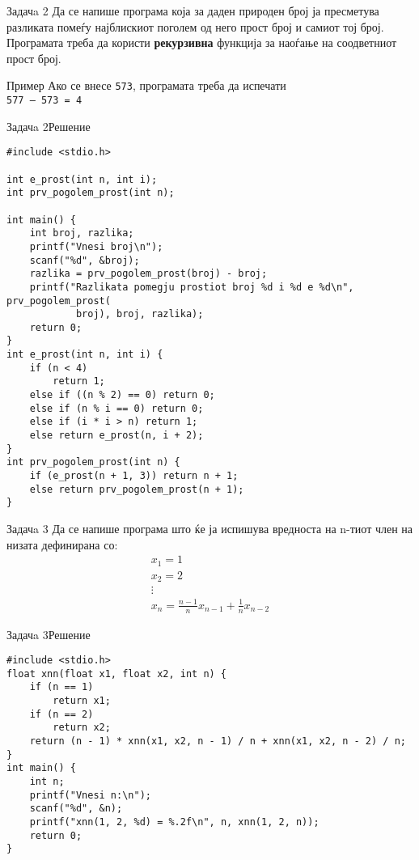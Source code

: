 \begin{frame}{Задачa 2}
Да се напише програма која за даден природен број ја пресметува разликата помеѓу
најблискиот поголем од него прост број и самиот тој број. Програмата треба да
користи \textbf{рекурзивна} функција за наоѓање на соодветниот прост број.
\begin{exampleblock}{Пример}
Ако се внесе \texttt{573}, програмата треба да испечати\\
\texttt{577 – 573 = 4}
\end{exampleblock}
\end{frame}

\begin{frame}[fragile]{Задачa 2}{Решение} 
\begin{lstlisting}
#include <stdio.h>

int e_prost(int n, int i);
int prv_pogolem_prost(int n);

int main() {
    int broj, razlika;
    printf("Vnesi broj\n");
    scanf("%d", &broj);
    razlika = prv_pogolem_prost(broj) - broj;
    printf("Razlikata pomegju prostiot broj %d i %d e %d\n", prv_pogolem_prost(
            broj), broj, razlika);
    return 0;
}
int e_prost(int n, int i) {
    if (n < 4)
        return 1;
    else if ((n % 2) == 0) return 0;
    else if (n % i == 0) return 0;
    else if (i * i > n) return 1;
    else return e_prost(n, i + 2);
}
int prv_pogolem_prost(int n) {
    if (e_prost(n + 1, 3)) return n + 1;
    else return prv_pogolem_prost(n + 1);
}
\end{lstlisting}
\end{frame}

\begin{frame}{Задачa 3}
Да се напише програма што ќе ја испишува вредноста на n-тиот член на низата дефинирана со:
\[
   \begin{array}{l}
   x_1 = 1\\
   x_2 = 2\\ 
   \vdots\\
   x_n = \frac{n - 1}{n}x_{n - 1} + \frac{1}{n}x_{n - 2}
   \end{array}
\]
\end{frame}


\begin{frame}[fragile]{Задачa 3}{Решение}
\begin{lstlisting}
#include <stdio.h>
float xnn(float x1, float x2, int n) {
    if (n == 1)
        return x1;
    if (n == 2)
        return x2;
    return (n - 1) * xnn(x1, x2, n - 1) / n + xnn(x1, x2, n - 2) / n;
}
int main() {
    int n;
    printf("Vnesi n:\n");
    scanf("%d", &n);
    printf("xnn(1, 2, %d) = %.2f\n", n, xnn(1, 2, n));
    return 0;
}
\end{lstlisting}
\end{frame}


